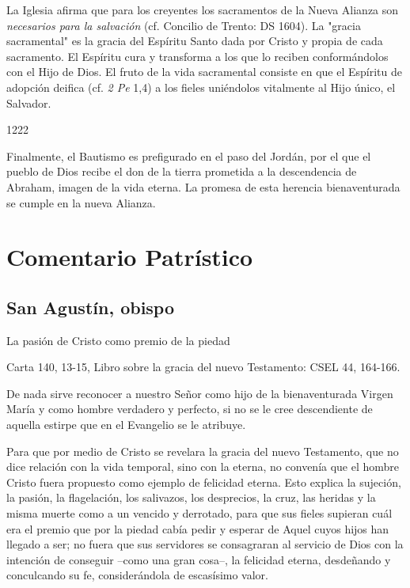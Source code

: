 \begin{ccebody} La Iglesia afirma que para los creyentes los sacramentos de la Nueva Alianza son \textit{necesarios para la salvación} (cf. Concilio de Trento: DS 1604). La "gracia sacramental" es la gracia del Espíritu Santo dada por Cristo y propia de cada sacramento. El Espíritu cura y transforma a los que lo reciben conformándolos con el Hijo de Dios. El fruto de la vida sacramental consiste en que el Espíritu de adopción deifica (cf. \textit{2 Pe} 1,4) a los fieles uniéndolos vitalmente al Hijo único, el Salvador.\end{ccebody}

\begin{ccebody}\begin{ccenumber}1222 \end{ccenumber}Finalmente, el Bautismo es prefigurado en el paso del Jordán, por el que el pueblo de Dios recibe el don de la tierra prometida a la descendencia de Abraham, imagen de la vida eterna. La promesa de esta herencia bienaventurada se cumple en la nueva Alianza.\end{ccebody}

\section{Comentario Patrístico}

\subsection{San Agustín, obispo}

\begin{patertheme}La pasión de Cristo como premio de la piedad\end{patertheme}

\begin{patersource} Carta 140, 13-15, Libro sobre la gracia del nuevo Testamento: CSEL 44, 164-166.\end{patersource}

\begin{body}De nada sirve reconocer a nuestro Señor como hijo de la bienaventurada Virgen María y como hombre verdadero y perfecto, si no se le cree descendiente de aquella estirpe que en el Evangelio se le atribuye.\end{body}

\begin{body}Para que por medio de Cristo se revelara la gracia del nuevo Testamento, que no dice relación con la vida temporal, sino con la eterna, no convenía que el hombre Cristo fuera propuesto como ejemplo de felicidad eterna. Esto explica la sujeción, la pasión, la flagelación, los salivazos, los desprecios, la cruz, las heridas y la misma muerte como a un vencido y derrotado, para que sus fieles supieran cuál era el premio que por la piedad cabía pedir y esperar de Aquel cuyos hijos han llegado a ser; no fuera que sus servidores se consagraran al servicio de Dios con la intención de conseguir –como una gran cosa–, la felicidad eterna, desdeñando y conculcando su fe, considerándola de escasísimo valor.\end{body}

